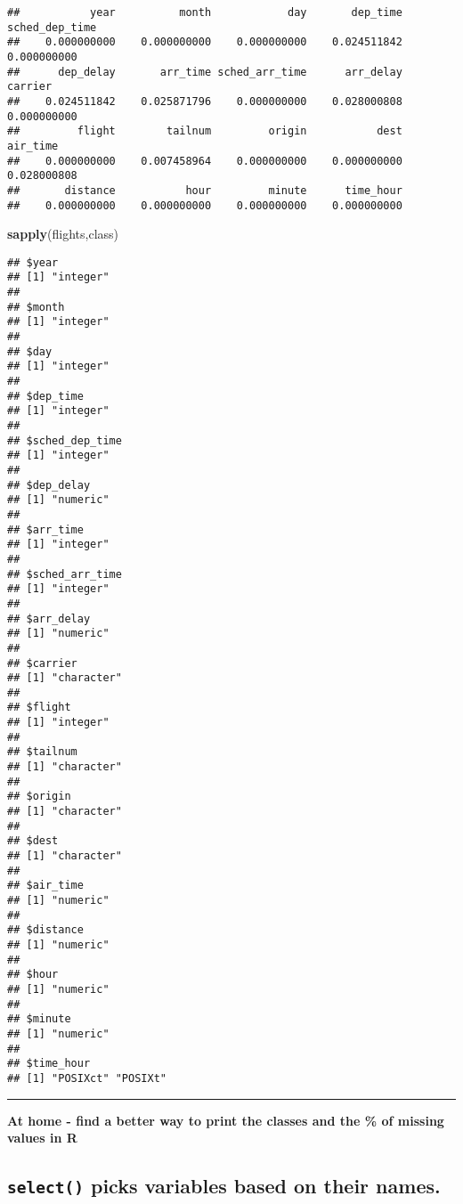 \documentclass[]{article}
\newenvironment{Shaded}{\begin{snugshade}}{\end{snugshade}}
\newcommand{\KeywordTok}[1]{\textcolor[rgb]{0.13,0.29,0.53}{\textbf{#1}}}
\newcommand{\NormalTok}[1]{#1}
\begin{document}
\begin{verbatim}
##           year          month            day       dep_time sched_dep_time 
##    0.000000000    0.000000000    0.000000000    0.024511842    0.000000000 
##      dep_delay       arr_time sched_arr_time      arr_delay        carrier 
##    0.024511842    0.025871796    0.000000000    0.028000808    0.000000000 
##         flight        tailnum         origin           dest       air_time 
##    0.000000000    0.007458964    0.000000000    0.000000000    0.028000808 
##       distance           hour         minute      time_hour 
##    0.000000000    0.000000000    0.000000000    0.000000000
\end{verbatim}

\begin{Shaded}
\begin{Highlighting}[]
\KeywordTok{sapply}\NormalTok{(flights,class)}
\end{Highlighting}
\end{Shaded}

\begin{verbatim}
## $year
## [1] "integer"
## 
## $month
## [1] "integer"
## 
## $day
## [1] "integer"
## 
## $dep_time
## [1] "integer"
## 
## $sched_dep_time
## [1] "integer"
## 
## $dep_delay
## [1] "numeric"
## 
## $arr_time
## [1] "integer"
## 
## $sched_arr_time
## [1] "integer"
## 
## $arr_delay
## [1] "numeric"
## 
## $carrier
## [1] "character"
## 
## $flight
## [1] "integer"
## 
## $tailnum
## [1] "character"
## 
## $origin
## [1] "character"
## 
## $dest
## [1] "character"
## 
## $air_time
## [1] "numeric"
## 
## $distance
## [1] "numeric"
## 
## $hour
## [1] "numeric"
## 
## $minute
## [1] "numeric"
## 
## $time_hour
## [1] "POSIXct" "POSIXt"
\end{verbatim}

\begin{center}\rule{0.5\linewidth}{\linethickness}\end{center}

\textbf{At home - find a better way to print the classes and the \% of
missing values in R}

\hypertarget{select-picks-variables-based-on-their-names.}{%
\subsection{\texorpdfstring{\texttt{select()} picks variables based on
their
names.}{select() picks variables based on their names.}}\label{select-picks-variables-based-on-their-names.}}
\end{document}
